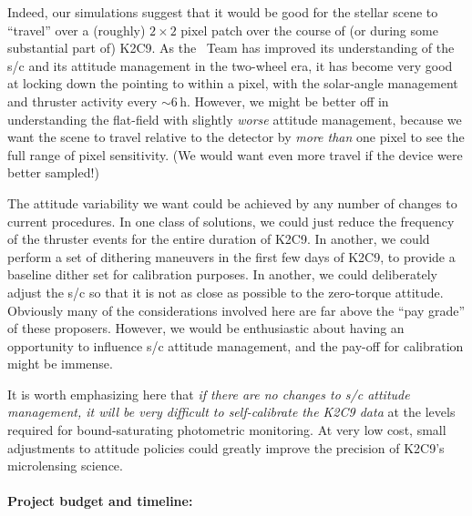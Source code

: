 \documentclass[12pt,preprint]{aastex}
\begin{document}
Indeed, our simulations suggest that it would be good for the stellar
scene to ``travel'' over a (roughly) $2\times2$ pixel patch over the
course of (or during some substantial part of) K2C9.
As the \ktwo\ Team has improved its understanding of the s/c and its
attitude management in the two-wheel era, it has become very good at
locking down the pointing to within a pixel, with the solar-angle
management and thruster activity every $\sim 6$\,h.
However, we might be better off in understanding the flat-field with
slightly \emph{worse} attitude management, because we want the scene
to travel relative to the detector by \emph{more than} one pixel to
see the full range of pixel sensitivity.
(We would want even more travel if the device were better sampled!)

The attitude variability we want could be achieved by any number of
changes to current procedures.
In one class of solutions, we could just reduce the frequency of the
thruster events for the entire duration of K2C9.
In another, we could perform a set of dithering maneuvers in the first
few days of K2C9, to provide a baseline dither set for calibration
purposes.
In another, we could deliberately adjust the s/c so that it is not as
close as possible to the zero-torque attitude.
Obviously many of the considerations involved here are far above the
``pay grade'' of these proposers.
However, we would be enthusiastic about having an opportunity to influence
s/c attitude management, and the pay-off for calibration might be immense.

It is worth emphasizing here that \emph{if there are no changes to s/c
  attitude management, it will be very difficult to self-calibrate the
  K2C9 data} at the levels required for bound-saturating photometric monitoring.
At very low cost, small adjustments to attitude policies could greatly
improve the precision of K2C9's microlensing science.

\paragraph{Project budget and timeline:}
\end{document}

